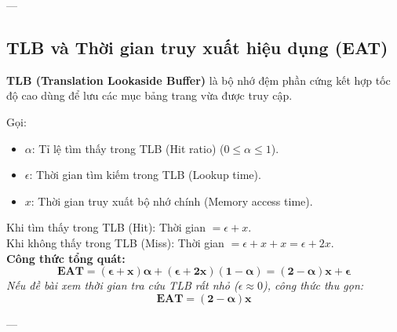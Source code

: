 \documentclass[11pt,a4paper]{article}
\begin{document}
---

\subsection{TLB và Thời gian truy xuất hiệu dụng (EAT)}
\textbf{TLB (Translation Lookaside Buffer)} là bộ nhớ đệm phần cứng kết hợp tốc độ cao dùng để lưu các mục bảng trang vừa được truy cập.

\begin{importantbox}
Gọi:
\begin{itemize}[noitemsep]
    \item $\alpha$: Tỉ lệ tìm thấy trong TLB (Hit ratio) ($0 \le \alpha \le 1$).
    \item $\epsilon$: Thời gian tìm kiếm trong TLB (Lookup time).
    \item $x$: Thời gian truy xuất bộ nhớ chính (Memory access time).
\end{itemize}
Khi tìm thấy trong TLB (Hit): Thời gian $= \epsilon + x$.\\
Khi không thấy trong TLB (Miss): Thời gian $= \epsilon + x + x = \epsilon + 2x$.\\
\textbf{Công thức tổng quát:}
\begin{equation}
\mathbf{EAT = (\epsilon + x)\alpha + (\epsilon + 2x)(1 - \alpha) = (2 - \alpha)x + \epsilon}
\end{equation}
\textit{Nếu đề bài xem thời gian tra cứu TLB rất nhỏ ($\epsilon \approx 0$), công thức thu gọn:}
\begin{equation}
\mathbf{EAT = (2 - \alpha)x}
\end{equation}
\end{importantbox}

---
\end{document}
